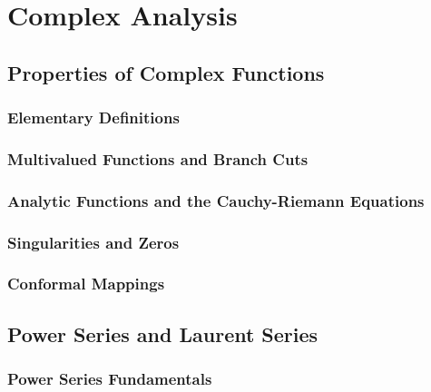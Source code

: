 \documentclass[12pt, a4paper, oneside, openright, titlepage]{book}
\begin{document}
\tableofcontents



\part{Complex Analysis}


\chapter{Properties of Complex Functions}

\section{Elementary Definitions}


\section{Multivalued Functions and Branch Cuts}


\section{Analytic Functions and the Cauchy-Riemann Equations}


\section{Singularities and Zeros}


\section{Conformal Mappings}


\chapter{Power Series and Laurent Series}


\section{Power Series Fundamentals}
\end{document}
